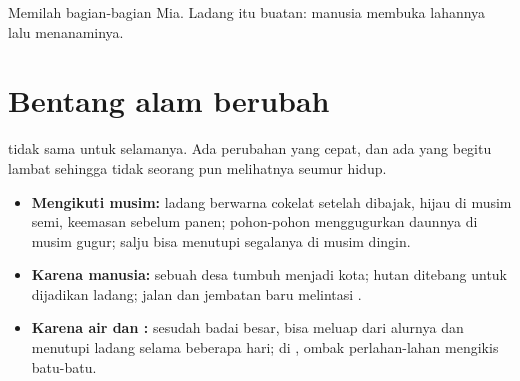\begin{omfigure}

{\small Memilah bagian-bagian  Mia. Ladang itu buatan: manusia
membuka lahannya lalu menanaminya.}
\label{fig:g1:landscapes-around-us:sort}
\end{omfigure}

\section{Bentang alam berubah}

 tidak sama untuk selamanya. Ada perubahan yang cepat, dan ada
yang begitu lambat sehingga tidak seorang pun melihatnya seumur hidup.
\begin{itemize}
  \item \textbf{Mengikuti musim:} ladang berwarna cokelat setelah dibajak,
        hijau di musim semi, keemasan sebelum panen; pohon-pohon
        menggugurkan daunnya di musim gugur; salju bisa menutupi segalanya
        di musim dingin.
  \item \textbf{Karena manusia:} sebuah desa tumbuh menjadi kota; hutan
        ditebang untuk dijadikan ladang; jalan dan jembatan baru melintasi
        .
  \item \textbf{Karena air dan :} sesudah badai besar,  bisa
        meluap dari alurnya dan menutupi ladang selama beberapa hari; di
        , ombak perlahan-lahan mengikis batu-batu.
\end{itemize}


